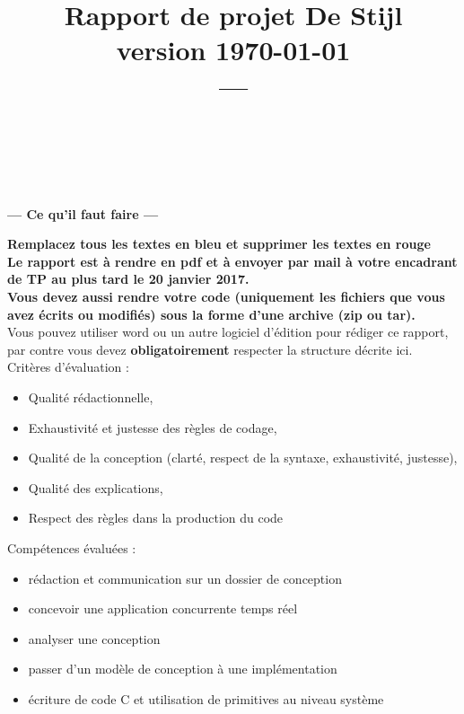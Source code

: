 \documentclass[11pt, a4paper]{paper}
\title{{\Huge Rapport de projet De Stijl}\\
{\large version \today}\\
---\\
}
\author{\color{blue}{Mettez ici vos noms et les parties sur lesquelles vous avez travaillées :}\\
\color{blue}{conception, robot, vidéo, mission, intégration, rédaction du compte-rendu}\\
\color{blue}{Exemple : P.-E. Hladik (conception, robot, rédaction du compte-rendu)}
}
\begin{document}
\maketitle


{\color{red}
\begin{framed}
\begin{center}{\bf\Large --- Ce qu'il faut faire --- } \end{center}

{\bf Remplacez tous les textes en bleu et supprimer les textes en rouge}\\


{\bf Le rapport est à rendre en pdf et à envoyer par mail à votre encadrant de TP au plus tard le 20 janvier 2017.}\\

{\bf Vous devez aussi rendre votre code (uniquement les fichiers que vous avez écrits ou modifiés) sous la forme d'une archive (zip ou tar).}\\

Vous pouvez utiliser word ou un autre logiciel d'édition pour rédiger ce rapport, par contre vous devez  {\bf obligatoirement} respecter la structure décrite ici.\\


Critères d'évaluation :
\begin{itemize}
	\item Qualité rédactionnelle,
	\item Exhaustivité et justesse des règles de codage,
	\item Qualité de la conception (clarté, respect de la syntaxe, exhaustivité, justesse),
	\item Qualité des explications,
	\item Respect des règles dans la production du code\\
\end{itemize}

Compétences évaluées :
\begin{itemize}
	\item rédaction et communication sur un dossier de conception
	\item concevoir une application concurrente temps réel
	\item analyser une conception
	\item passer d'un modèle de conception à une implémentation
	\item écriture de code C et utilisation de primitives au niveau système
\end{itemize}
\end{framed}
}
\end{document}
